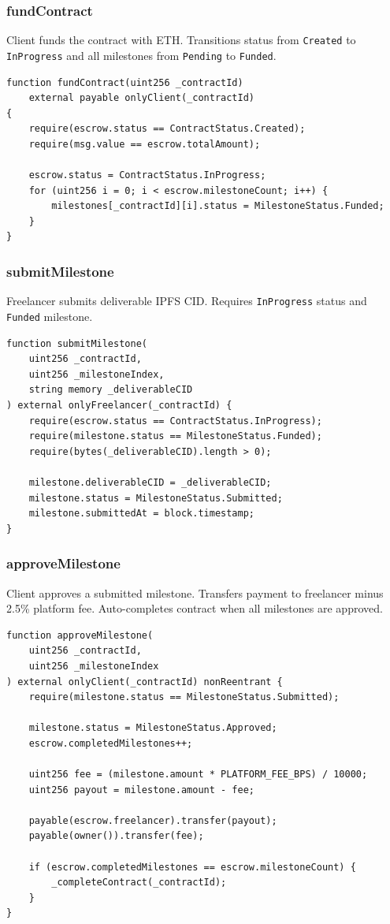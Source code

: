 \documentclass[12pt,a4paper]{article}
\begin{document}
\subsubsection{fundContract}
Client funds the contract with ETH. Transitions status from \texttt{Created} to \texttt{InProgress} and all milestones from \texttt{Pending} to \texttt{Funded}.

\begin{lstlisting}[style=soliditystyle]
function fundContract(uint256 _contractId)
    external payable onlyClient(_contractId)
{
    require(escrow.status == ContractStatus.Created);
    require(msg.value == escrow.totalAmount);

    escrow.status = ContractStatus.InProgress;
    for (uint256 i = 0; i < escrow.milestoneCount; i++) {
        milestones[_contractId][i].status = MilestoneStatus.Funded;
    }
}
\end{lstlisting}

\subsubsection{submitMilestone}
Freelancer submits deliverable IPFS CID. Requires \texttt{InProgress} status and \texttt{Funded} milestone.

\begin{lstlisting}[style=soliditystyle]
function submitMilestone(
    uint256 _contractId,
    uint256 _milestoneIndex,
    string memory _deliverableCID
) external onlyFreelancer(_contractId) {
    require(escrow.status == ContractStatus.InProgress);
    require(milestone.status == MilestoneStatus.Funded);
    require(bytes(_deliverableCID).length > 0);

    milestone.deliverableCID = _deliverableCID;
    milestone.status = MilestoneStatus.Submitted;
    milestone.submittedAt = block.timestamp;
}
\end{lstlisting}

\subsubsection{approveMilestone}
Client approves a submitted milestone. Transfers payment to freelancer minus 2.5\% platform fee. Auto-completes contract when all milestones are approved.

\begin{lstlisting}[style=soliditystyle]
function approveMilestone(
    uint256 _contractId,
    uint256 _milestoneIndex
) external onlyClient(_contractId) nonReentrant {
    require(milestone.status == MilestoneStatus.Submitted);

    milestone.status = MilestoneStatus.Approved;
    escrow.completedMilestones++;

    uint256 fee = (milestone.amount * PLATFORM_FEE_BPS) / 10000;
    uint256 payout = milestone.amount - fee;

    payable(escrow.freelancer).transfer(payout);
    payable(owner()).transfer(fee);

    if (escrow.completedMilestones == escrow.milestoneCount) {
        _completeContract(_contractId);
    }
}
\end{lstlisting}
\end{document}
